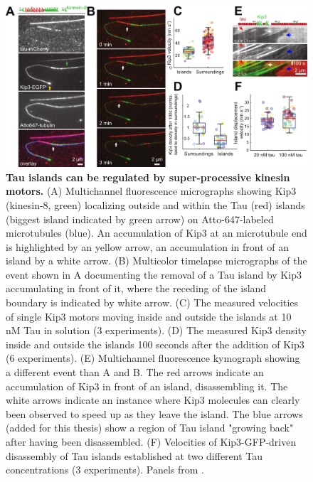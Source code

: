 \begin{figure}[h!]
\centering
\includegraphics[width=1\linewidth]{Figures/Taukip3.png}
\caption[Tau islands can be regulated by super-processive kinesin motors.]{
\textbf{Tau islands can be regulated by super-processive kinesin motors.} (A) Multichannel fluorescence micrographs showing Kip3 (kinesin-8, green) localizing outside and within the Tau (red) islands (biggest island indicated by green arrow) on Atto-647-labeled microtubules (blue). An accumulation of Kip3 at an microtubule end is highlighted by an yellow arrow, an accumulation in front of an island by a white arrow. (B) Multicolor timelapse micrographs of the event shown in A documenting the removal of a Tau island by Kip3 accumulating in front of it, where the receding of the island boundary is indicated by white arrow. (C) The measured velocities of single Kip3 motors moving inside and outside the islands at 10 nM Tau in solution (3 experiments). (D) The measured Kip3 density inside and outside the islands 100 seconds after the addition of Kip3 (6 experiments). (E) Multichannel fluorescence kymograph showing a different event than A and B. The red arrows indicate an accumulation of Kip3 in front of an island, disassembling it. The white arrows indicate an instance where Kip3 molecules can clearly been observed to speed up as they leave the island. The blue arrows (added for this thesis) show a region of Tau island "growing back" after having been disassembled. (F) Velocities of Kip3-GFP-driven disassembly of Tau islands established at two different Tau concentrations (3 experiments). Panels from \cite{Siahaan2019a}.
	}\label{Taukip3}
\end{figure}

\FloatBarrier
